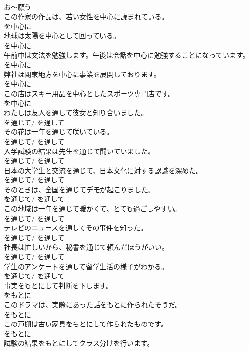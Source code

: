 \documentclass[8pt]{extreport}
\begin{document}
\begin{CJK}{UTF8}{min}
\\	お～願う
\\	この作家の作品は、若い女性を中心に読まれている。	
\\	を中心に
\\	地球は太陽を中心として回っている。	
\\	を中心に
\\	午前中は文法を勉強します。午後は会話を中心に勉強することになっています。	
\\	を中心に
\\	弊社は関東地方を中心に事業を展開しております。	
\\	を中心に
\\	この店はスキー用品を中心としたスポーツ専門店です。	
\\	を中心に
\\	わたしは友人を通して彼女と知り合いました。	
\\	を通じて/ を通して
\\	その花は一年を通じて咲いている。	
\\	を通じて/ を通して
\\	入学試験の結果は先生を通じて聞いていました。	
\\	を通じて/ を通して
\\	日本の大学生と交流を通じて、日本文化に対する認識を深めた。	
\\	を通じて/ を通して
\\	そのときは、全国を通じてデモが起こりました。	
\\	を通じて/ を通して
\\	この地域は一年を通じて暖かくて、とても過ごしやすい。	
\\	を通じて/ を通して
\\	テレビのニュースを通してその事件を知った。	
\\	を通じて/ を通して
\\	社長は忙しいから、秘書を通じて頼んだほうがいい。	
\\	を通じて/ を通して
\\	学生のアンケートを通して留学生活の様子がわかる。	
\\	を通じて/ を通して
\\	事実をもとにして判断を下します。	
\\	をもとに
\\	このドラマは、実際にあった話をもとに作られたそうだ。	
\\	をもとに
\\	この戸棚は古い家具をもとにして作られたものです。	
\\	をもとに
\\	試験の結果をもとにしてクラス分けを行います。	

\end{CJK}
\end{document}

